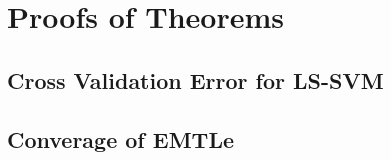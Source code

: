 \chapter{Proofs of Theorems}
%
\section{Cross Validation Error for LS-SVM}\label{app:cross}

\section{Converage of EMTLe}\label{app:converg}

%